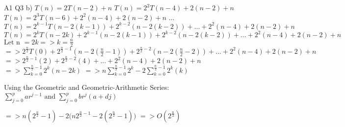 \documentclass[10pt, a4paper]{article}
\begin{document}
\begin{flushleft}
		A1 Q3 b)\linebreak\linebreak
		$T(n) = 2T(n-2)  + n $\linebreak
		$ T(n) = 2^{2}T(n-4) + 2(n-2) + n $ \linebreak
		$ T(n) = 2^{3}T(n-6) + 2^{2}(n-4) + 2(n-2) + n $ \linebreak 
		...\linebreak 
		$T(n) = 2^{k-1}T(n - 2(k-1)) + 2^{k-2}(n - 2(k-2)) + … + 2^{2}(n-4) + 2(n-2) + n$ \linebreak
		$T(n) = 2^{k}T(n-2k) + 2^{k-1}(n-2(k-1)) + 2^{k-2}(n-2(k-2)) + … + 2^{2}(n-4) + 2(n-2) + n$ \linebreak
		$\text{Let n } = 2k => k = \frac{n} {2}$ \linebreak
		$=> 2^{\frac{n}{2}}T(0) + 2^{\frac{n}{2}-1}(n-2({\frac{n}{2}}-1)) + 2^{\frac{n}{2}-2}(n-2({\frac{n}{2}}-2)) + … + 2^{2}(n-4) + 2(n-2) + n$ \linebreak
		$=> 2^{\frac{n}{2}-1}(2) + 2^{\frac{n}{2}-2}(4) + … + 2^{2}(n-4) + 2(n-2) + n$ \linebreak
		$=>  {\sum_{k=0}^{\frac{n}{2} -1}2^{k}}{(n-2k)}  $ \linebreak
		$=>  {n\sum_{k=0}^{\frac{n}{2} -1}2^{k}} - {2\sum_{k=0}^{\frac{n}{2} -1}2^{k}}{(k)}  $ \linebreak

		Using the Geometric and Geometric-Arithmetic Series: ${\sum_{j=0}^{p}}{{ar^{j-1}}} \text{ and } {\sum_{j=0}^{p}}{br^{j}{(a+dj)}}  $ \linebreak

		$=>  {n(2^{\frac{n}{2}} - 1)} - {2(n2^{\frac{n}{2} -1}} - 2(2^{\frac{n}{2}} -1))  $ \linebreak
		$=>  {O(2^{\frac{n}{2}})} $ 



\end{flushleft} 
\end{document}
